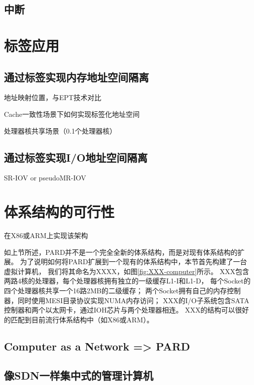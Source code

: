 \subsection{中断}


\section{标签应用}

\subsection{通过标签实现内存地址空间隔离}

地址映射位置，与EPT技术对比

Cache一致性场景下如何实现标签化地址空间

处理器核共享场景（0.1个处理器核）

\subsection{通过标签实现I/O地址空间隔离}

SR-IOV or pseudoMR-IOV





\section{体系结构的可行性}

在X86或ARM上实现该架构


如上节所述，PARD并不是一个完全全新的体系结构，而是对现有体系结构的扩展。
为了说明如何将PARD扩展到一个现有的体系结构中，本节首先构建了一台虚拟计算机，
我们将其命名为XXXX，如图\ref{fig:XXX-computer}所示。
XXX包含两路4核的处理器，每个处理器核拥有独立的一级缓存L1-I和L1-D，
每个Socket的四个处理器核共享一个16路2MB的二级缓存；
两个Socket拥有自己的内存控制器，同时使用MESI目录协议实现NUMA内存访问；
XXX的I/O子系统包含SATA控制器和两个以太网卡，通过IOH芯片与两个处理器相连。
XXX的结构可以很好的匹配到目前流行体系结构中（如X86或ARM）。

\subsection{Computer as a Network => PARD}

\subsection{像SDN一样集中式的管理计算机}

